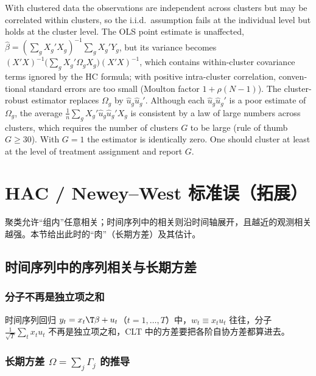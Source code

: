 \begin{english}
With clustered data the observations are independent across clusters but may be correlated within clusters, so the i.i.d.\ assumption fails at the individual level but holds at the cluster level. The OLS point estimate is unaffected, $\hat\beta=(\sum_g X_g'X_g)^{-1}\sum_g X_g'Y_g$, but its variance becomes $(X'X)^{-1}\bigl(\sum_g X_g'\Omega_gX_g\bigr)(X'X)^{-1}$, which contains within-cluster covariance terms ignored by the HC formula; with positive intra-cluster correlation, conventional standard errors are too small (Moulton factor $1+\rho(N-1)$). The cluster-robust estimator replaces $\Omega_g$ by $\hat u_g\hat u_g'$. Although each $\hat u_g\hat u_g'$ is a poor estimate of $\Omega_g$, the average $\frac1n\sum_g X_g'\hat u_g\hat u_g'X_g$ is consistent by a law of large numbers across clusters, which requires the number of clusters $G$ to be large (rule of thumb $G\ge30$). With $G=1$ the estimator is identically zero. One should cluster at least at the level of treatment assignment and report $G$.
\end{english}

\section{HAC / Newey--West 标准误（拓展）}\label{sec:U05b-hac}

聚类允许“组内”任意相关；时间序列中的相关则沿时间轴展开，且越近的观测相关越强。本节给出此时的“肉”（长期方差）及其估计。

\subsection{时间序列中的序列相关与长期方差}

\subsubsection{分子不再是独立项之和}

时间序列回归 $y_t=x_t\T\beta+u_t$（$t=1,\dots,T$）中，$w_t\equiv x_tu_t$ 往往，分子 $\frac1{\sqrt T}\sum_tx_tu_t$ 不再是独立项之和，CLT 中的方差要把各阶自协方差都算进去。

\subsubsection{长期方差 \texorpdfstring{$\Omega=\sum_j\Gamma_j$}{Omega = sum Gamma\_j} 的推导}

